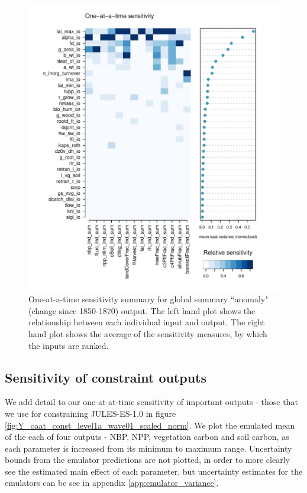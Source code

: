 \documentclass[gmd, manuscript]{copernicus}
\begin{document}
\begin{figure}[t]
\includegraphics[width=12cm]{./figs/fig08.pdf}
\caption{One-at-a-time sensitivity summary for global summary ``anomaly" (change since 1850-1870) output. The left hand plot shows the relationship between each individual input and output. The right hand plot shows the average of the sensitivity measures, by which the inputs are ranked.}
\label{fig:oat_var_sensmat_level1a_wave01_Anom}
\end{figure}

\subsection{Sensitivity of constraint outputs}\label{ssec:sa_constraint_outputs}

We add detail to our one-at-at-time sensitivity of important outputs - those that we use for constraining JULES-ES-1.0 in figure \ref{fig:Y_oaat_const_level1a_wave01_scaled_norm}. We plot the emulated mean of the each of four outputs - NBP, NPP, vegetation carbon and soil carbon, as each parameter is increased from its minimum to maximum range. Uncertainty bounds from the emulator predictions are not plotted, in order to more clearly see the estimated main effect of each parameter, but uncertainty estimates for the emulators can be see in appendix \ref{app:emulator_variance}.
\end{document}
